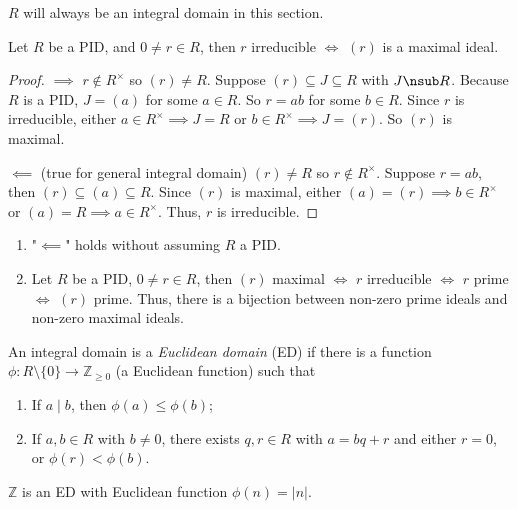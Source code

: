 \(R\) will always be an integral domain in this section.
\begin{lemma}
    Let \(R\) be a PID, and \(0 \neq r \in R\), then \(r\) irreducible \(\iff \) \((r)\) is a maximal ideal.
\end{lemma}
\begin{proof}
    \(\implies\) \(r\notin R^\times\) so \((r) \neq R\). Suppose \((r) \subseteq J \subseteq R\) with \(J \nsub R\). Because \(R\) is a PID, \(J = (a)\) for some \(a \in R\). So \(r = ab\) for some \(b \in R\). Since \(r\) is irreducible, either \(a \in R^\times \implies J = R\) or \(b \in R^\times \implies J = (r)\). So \((r)\) is maximal.

    \(\impliedby\) (true for general integral domain) \((r) \neq R\) so \(r \notin R^\times \). Suppose \(r = ab\), then \((r) \subseteq (a) \subseteq R\). Since \((r)\) is maximal, either \((a) = (r) \implies b \in R^\times\) or \((a) = R \implies a \in R^\times\). Thus, \(r\) is irreducible.
\end{proof}
\begin{remark}
    \leavevmode
    \begin{enumerate}
        \item "\(\impliedby\)" holds without assuming \(R\) a PID.
        \item Let \(R\) be a PID, \(0 \neq r \in R\), then \((r)\) maximal \(\iff \) \(r\) irreducible \(\iff \) \(r\) prime \(\iff \) \((r)\) prime. Thus, there is a bijection between non-zero prime ideals and non-zero maximal ideals.
    \end{enumerate}
\end{remark}
\begin{definition}
    An integral domain is a \textit{Euclidean domain} (ED) if there is a function \(\phi:R\setminus \{0\} \to \mathbb{Z}_{\geq 0}\) (a Euclidean function) such that
    \begin{enumerate}
        \item If \(a\mid b\), then \(\phi(a) \leq \phi(b)\);
        \item If \(a,b \in R\) with \(b \neq 0\), there exists \(q, r \in R\) with \(a = bq + r\) and either \(r = 0\), or \(\phi(r) < \phi(b)\).
    \end{enumerate}
\end{definition}
\begin{example}
    \(\mathbb{Z}\) is an ED with Euclidean function \(\phi(n) = \left\vert n \right\vert\).
\end{example}

